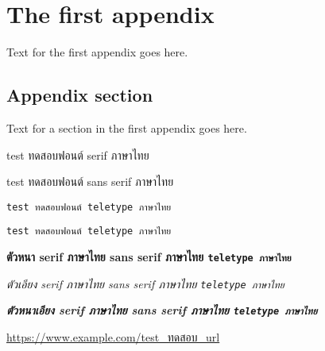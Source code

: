 \chapter{The first appendix}

Text for the first appendix goes here.

\section{Appendix section}

Text for a section in the first appendix goes here.

test ทดสอบฟอนต์ serif ภาษาไทย

\textsf{test ทดสอบฟอนต์ sans serif ภาษาไทย}

\verb+test ทดสอบฟอนต์ teletype ภาษาไทย+

\texttt{test ทดสอบฟอนต์ teletype ภาษาไทย}

\textbf{ตัวหนา serif ภาษาไทย \textsf{sans serif ภาษาไทย} \texttt{teletype ภาษาไทย}}

\textit{ตัวเอียง serif ภาษาไทย \textsf{sans serif ภาษาไทย} \texttt{teletype ภาษาไทย}}

\textbf{\textit{ตัวหนาเอียง serif ภาษาไทย \textsf{sans serif ภาษาไทย} \texttt{teletype ภาษาไทย}}}

\url{https://www.example.com/test_ทดสอบ_url}


